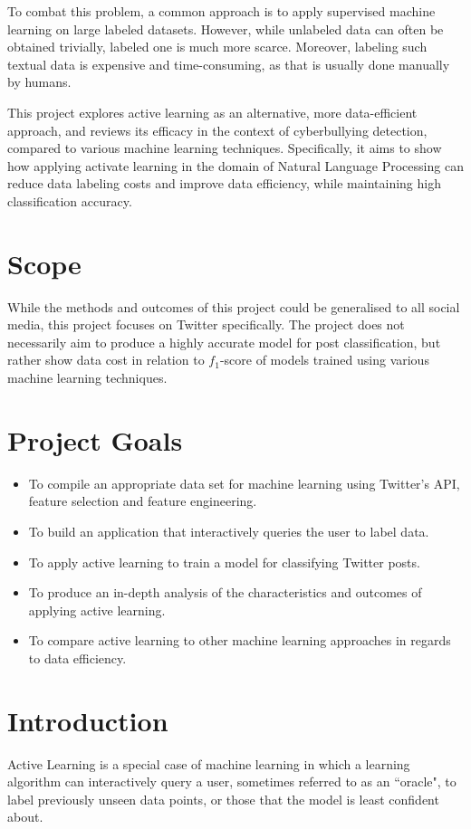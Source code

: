 \documentclass[a4paper,12pt]{article}
\begin{document}
To combat this problem, a common approach is to apply supervised machine learning on large labeled datasets. However, while unlabeled data can often be obtained trivially, labeled one is much more scarce. Moreover, labeling such textual data is expensive and time-consuming, as that is usually done manually by humans.

This project explores active learning as an alternative, more data-efficient approach, and reviews its efficacy in the context of cyberbullying detection, compared to various machine learning techniques. Specifically, it aims to show how applying activate learning in the domain of Natural Language Processing can reduce data labeling costs and improve data efficiency, while maintaining high classification accuracy.
\section*{Scope}
While the methods and outcomes of this project could be generalised to all social media, this project focuses on Twitter specifically. The project does not necessarily aim to produce a highly accurate model for post classification, but rather show data cost in relation to $f_1$-score of models trained using various machine learning techniques.
\section*{Project Goals}
\begin{itemize}
    \item To compile an appropriate data set for machine learning using Twitter's API, feature selection and feature engineering.
    \item To build an application that interactively queries the user to label data.
    \item To apply active learning to train a model for classifying Twitter posts.
    \item To produce an in-depth analysis of the characteristics and outcomes of applying active learning.
    \item To compare active learning to other machine learning approaches in regards to data efficiency. 
\end{itemize}
\newpage

\tableofcontents
\newpage
\section{Introduction}
Active Learning is a special case of machine learning in which a learning algorithm can interactively query a user, sometimes referred to as an ``oracle", to label previously unseen data points, or those that the model is least confident about.
\end{document}

